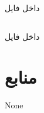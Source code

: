 \documentclass{article}
\begin{document}
\section{}%
\subsection{}
داخل فایل 
\subsection{}
داخل فایل 


\section*{منابع}
\renewcommand{\section}[2]{}%
\begin{thebibliography}{99} %


\begin{LTRitems}

\resetlatinfont

 None
\end{LTRitems}

\end{thebibliography}
\end{document}
